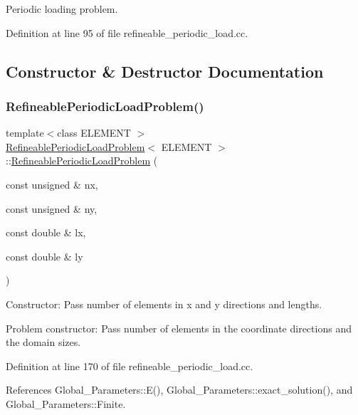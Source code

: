 Periodic loading problem. 

Definition at line 95 of file refineable\+\_\+periodic\+\_\+load.\+cc.



\subsection{Constructor \& Destructor Documentation}
\mbox{\label{classRefineablePeriodicLoadProblem_ae950fdcf80e684eddb29358e1f9a3412}} 
\subsubsection{\texorpdfstring{Refineable\+Periodic\+Load\+Problem()}{RefineablePeriodicLoadProblem()}}
{\footnotesize\ttfamily template$<$class E\+L\+E\+M\+E\+NT $>$ \\
\hyperlink{classRefineablePeriodicLoadProblem}{Refineable\+Periodic\+Load\+Problem}$<$ E\+L\+E\+M\+E\+NT $>$\+::\hyperlink{classRefineablePeriodicLoadProblem}{Refineable\+Periodic\+Load\+Problem} (\begin{DoxyParamCaption}\item[{const unsigned \&}]{nx,  }\item[{const unsigned \&}]{ny,  }\item[{const double \&}]{lx,  }\item[{const double \&}]{ly }\end{DoxyParamCaption})}



Constructor\+: Pass number of elements in x and y directions and lengths. 

Problem constructor\+: Pass number of elements in the coordinate directions and the domain sizes. 

Definition at line 170 of file refineable\+\_\+periodic\+\_\+load.\+cc.



References Global\+\_\+\+Parameters\+::\+E(), Global\+\_\+\+Parameters\+::exact\+\_\+solution(), and Global\+\_\+\+Parameters\+::\+Finite.



